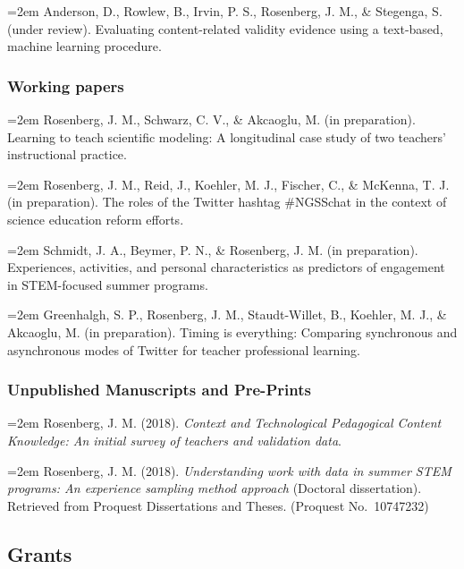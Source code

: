 \documentclass[14,]{article}
\begin{document}
\hangindent=2em Anderson, D., Rowlew, B., Irvin, P. S., Rosenberg, J.
M., \& Stegenga, S. (under review). Evaluating content-related validity
evidence using a text-based, machine learning procedure.

\hypertarget{working-papers}{%
\subsubsection{Working papers}\label{working-papers}}

\hangindent=2em Rosenberg, J. M., Schwarz, C. V., \& Akcaoglu, M. (in
preparation). Learning to teach scientific modeling: A longitudinal case
study of two teachers' instructional practice.

\hangindent=2em Rosenberg, J. M., Reid, J., Koehler, M. J., Fischer, C.,
\& McKenna, T. J. (in preparation). The roles of the Twitter hashtag
\#NGSSchat in the context of science education reform efforts.

\hangindent=2em Schmidt, J. A., Beymer, P. N., \& Rosenberg, J. M. (in
preparation). Experiences, activities, and personal characteristics as
predictors of engagement in STEM-focused summer programs.

\hangindent=2em Greenhalgh, S. P., Rosenberg, J. M., Staudt-Willet, B.,
Koehler, M. J., \& Akcaoglu, M. (in preparation). Timing is everything:
Comparing synchronous and asynchronous modes of Twitter for teacher
professional learning.

\hypertarget{unpublished-manuscripts-and-pre-prints}{%
\subsubsection{Unpublished Manuscripts and
Pre-Prints}\label{unpublished-manuscripts-and-pre-prints}}

\hangindent=2em Rosenberg, J. M. (2018). \emph{Context and Technological
Pedagogical Content Knowledge: An initial survey of teachers and
validation data}.

\hangindent=2em Rosenberg, J. M. (2018). \emph{Understanding work with
data in summer STEM programs: An experience sampling method approach}
(Doctoral dissertation). Retrieved from Proquest Dissertations and
Theses. (Proquest No.~10747232)

\hypertarget{grants}{%
\subsection{Grants}\label{grants}}
\end{document}
